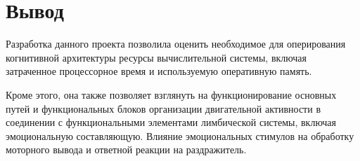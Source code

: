 \section{Вывод}
Разработка данного проекта позволила оценить необходимое для оперирования когнитивной архитектуры ресурсы вычислительной системы, включая затраченное процессорное время и используемую оперативную память.

Кроме этого, она также позволяет взглянуть на функционирование основных путей и функциональных блоков организации двигательной активности в соединении с функциональными элементами лимбической системы, включая эмоциональную составляющую.
Влияние эмоциональных стимулов на обработку моторного вывода и ответной реакции на раздражитель.

